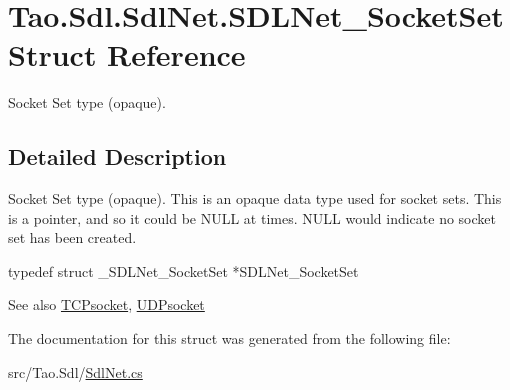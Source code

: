 \hypertarget{struct_tao_1_1_sdl_1_1_sdl_net_1_1_s_d_l_net___socket_set}{
\section{Tao.Sdl.SdlNet.SDLNet\_\-SocketSet Struct Reference}
\label{struct_tao_1_1_sdl_1_1_sdl_net_1_1_s_d_l_net___socket_set}
}


Socket Set type (opaque).  




\subsection{Detailed Description}
Socket Set type (opaque). This is an opaque data type used for socket sets. This is a pointer, and so it could be NULL at times. NULL would indicate no socket set has been created. 
\begin{DoxyCode}
                    typedef struct _SDLNet_SocketSet *SDLNet_SocketSet
\end{DoxyCode}


\begin{DoxySeeAlso}{See also}
\hyperlink{struct_tao_1_1_sdl_1_1_sdl_net_1_1_t_c_psocket}{TCPsocket}, \hyperlink{struct_tao_1_1_sdl_1_1_sdl_net_1_1_u_d_psocket}{UDPsocket}


\end{DoxySeeAlso}


The documentation for this struct was generated from the following file:\begin{DoxyCompactItemize}
\item 
src/Tao.Sdl/\hyperlink{_sdl_net_8cs}{SdlNet.cs}\end{DoxyCompactItemize}
